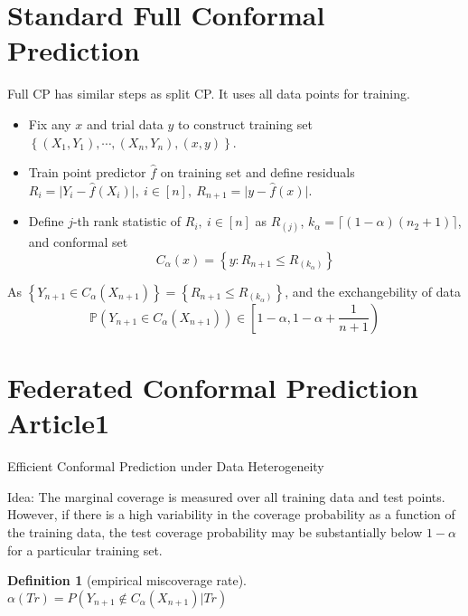 \documentclass[12pt, a4paper, oneside]{article}
\newtheorem{definition}[theorem]{Definition}
\begin{document}
\section{Standard Full Conformal Prediction}
    Full CP has similar steps as split CP. It uses all data points for training.
    \begin{itemize}
        \item Fix any $x$ and trial data $y$ to construct training set $\left\{ (X_1,Y_1),\cdots,(X_n,Y_n),(x,y) \right\}$.
        \item Train point predictor $\hat{f}$ on training set and define residuals $R_i=\Big|Y_i-\hat{f}(X_i)\Big|,\ i\in[n],\ R_{n+1}=\Big|y-\hat{f}(x)\Big|$.
        \item Define $j$-th rank statistic of $R_i,\ i\in[n]$ as $R_{(j)}$, $k_\alpha=\lceil (1-\alpha)(n_2+1)\rceil$, and conformal set
        \begin{equation*}
            C_\alpha(x)=\left\{ y:R_{n+1}\leq R_{(k_\alpha)} \right\}
        \end{equation*}
    \end{itemize}
    As $\left\{ Y_{n+1}\in C_\alpha(X_{n+1}) \right\}=\left\{ R_{n+1}\leq R_{(k_\alpha)} \right\}$, and the exchangebility of data
    \begin{equation*}
        \mathbb{P}\left( Y_{n+1}\in C_\alpha(X_{n+1}) \right)\in\left[1-\alpha,1-\alpha+\dfrac{1}{n+1}\right)
    \end{equation*}
    


\section{Federated Conformal Prediction Article1}
    Efficient Conformal Prediction under Data Heterogeneity\cite{plassier2024efficient}


    Idea: The marginal coverage is measured over all training data and test points. However, if there is a high variability in the coverage probability as a function of the training data, the test coverage probability may be substantially below $1-\alpha$ for a particular training set.
    \begin{definition}[empirical miscoverage rate]
        $\alpha(Tr)=P(Y_{n+1}\notin C_\alpha(X_{n+1})\Big|Tr)$
    \end{definition}
\newpage


\end{document}
